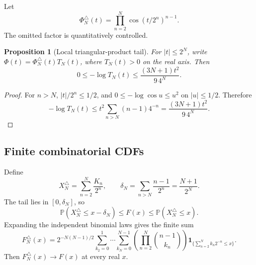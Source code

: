 \documentclass[11pt,oneside]{article}
\newtheorem{proposition}[theorem]{Proposition}
\theoremstyle{definition}
\theoremstyle{remark}
\newcommand{\Prob}{\mathbb P}
\newcommand{\1}{\mathbf 1}
\begin{document}
Let
\begin{equation}
 \Phi_N^\triangle(t)=\prod_{n=2}^{N}
 \cos(t/2^n)^{n-1}.                                     \label{eq:triangular-finite-product}
\end{equation}
The omitted factor is quantitatively controlled.

\begin{proposition}[Local triangular-product tail]
\label{prop:triangular-tail}
For $|t|\le2^N$, write $\Phi(t)=\Phi_N^\triangle(t)T_N(t)$, where
$T_N(t)>0$ on the real axis.  Then
\begin{equation}
 0\le-\log T_N(t)
 \le \frac{(3N+1)t^2}{9\,4^N}.                           \label{eq:triangular-tail}
\end{equation}
\end{proposition}

\begin{proof}
For $n>N$, $|t|/2^n\le1/2$, and
$0\le-\log\cos u\le u^2$ on $|u|\le1/2$.  Therefore
\[
 -\log T_N(t)
 \le t^2\sum_{n>N}(n-1)4^{-n}
 =\frac{(3N+1)t^2}{9\,4^N}.
\]
\end{proof}

\subsection{Finite combinatorial CDFs}

Define
\begin{equation}
 X_N^\triangle=\sum_{n=2}^{N}\frac{K_n}{2^n},
 \qquad
 \delta_N=\sum_{n>N}\frac{n-1}{2^n}=\frac{N+1}{2^N}.    \label{eq:triangular-truncation}
\end{equation}
The tail lies in $[0,\delta_N]$, so
\begin{equation}
 \Prob(X_N^\triangle\le x-\delta_N)
 \le F(x)\le
 \Prob(X_N^\triangle\le x).                             \label{eq:triangular-cdf-bracket}
\end{equation}
Expanding the independent binomial laws gives the finite sum
\begin{equation}
 \boxed{\displaystyle
 F_N^\triangle(x)=2^{-N(N-1)/2}
 \sum_{k_2=0}^{1}\cdots\sum_{k_N=0}^{N-1}
 \left(\prod_{n=2}^{N}\binom{n-1}{k_n}\right)
 \1_{\{\sum_{n=2}^{N}k_n2^{-n}\le x\}}.}              \label{eq:triangular-cdf}
\end{equation}
Then $F_N^\triangle(x)\to F(x)$ at every real $x$.
\end{document}
